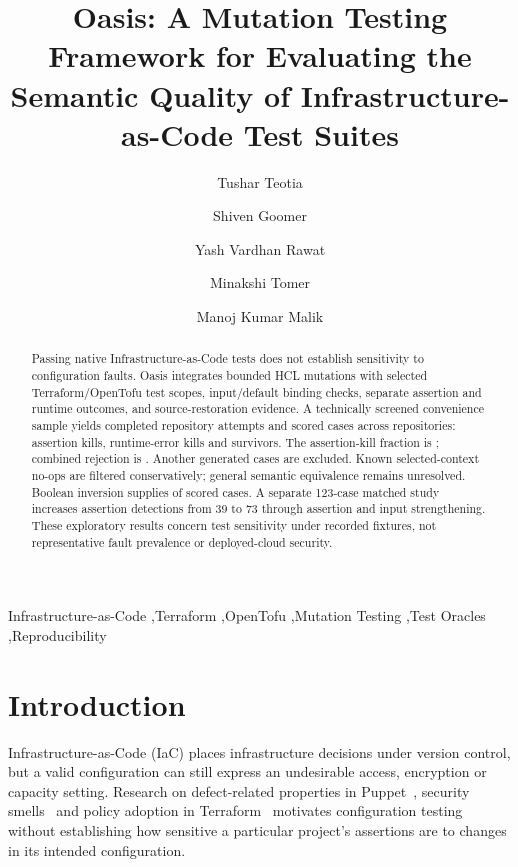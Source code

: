 


\begin{frontmatter}
\title{Oasis: A Mutation Testing Framework for Evaluating the Semantic Quality of Infrastructure-as-Code Test Suites}
\author[a]{Tushar Teotia}
\author[a]{Shiven Goomer}
\author[a]{Yash Vardhan Rawat}
\author[a]{Minakshi Tomer}
\author[a]{Manoj Kumar Malik}
\address[a]{Department of Information Technology, Maharaja Surajmal Institute of Technology, Janakpuri, New Delhi 110058, India}
\begin{abstract}
Passing native Infrastructure-as-Code tests does not establish sensitivity to configuration faults. Oasis integrates bounded HCL mutations with selected Terraform/OpenTofu test scopes, input/default binding checks, separate assertion and runtime outcomes, and source-restoration evidence. A technically screened convenience sample yields \ArchivedRepos{} completed repository attempts and \NScored{} scored cases across \ScoredRepos{} repositories: \AssertionKills{} assertion kills, \RuntimeKills{} runtime-error kills and \Survivors{} survivors. The assertion-kill fraction is \AssertionPct{}; combined rejection is \CombinedPct{}. Another \ExcludedCases{} generated cases are excluded. Known selected-context no-ops are filtered conservatively; general semantic equivalence remains unresolved. Boolean inversion supplies \BooleanShare{} of scored cases. A separate 123-case matched study increases assertion detections from 39 to 73 through assertion and input strengthening. These exploratory results concern test sensitivity under recorded fixtures, not representative fault prevalence or deployed-cloud security.
\end{abstract}
\begin{keyword}
Infrastructure-as-Code \sep Terraform \sep OpenTofu \sep Mutation Testing \sep Test Oracles \sep Reproducibility
\end{keyword}
\end{frontmatter}



\section{Introduction}\label{sec:introduction}
Infrastructure-as-Code (IaC) places infrastructure decisions under version control, but a valid configuration can still express an undesirable access, encryption or capacity setting. Research on defect-related properties in Puppet~\cite{rahman}, security smells~\cite{seven} and policy adoption in Terraform~\cite{verdet} motivates configuration testing without establishing how sensitive a particular project's assertions are to changes in its intended configuration.

